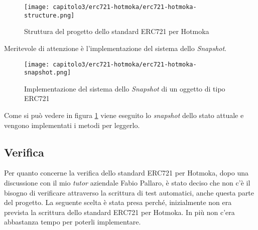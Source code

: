\clearpage

\begin{figure}[h!]
  \centering
  \texttt{[image: capitolo3/erc721-hotmoka/erc721-hotmoka-structure.png]}
  \caption{Struttura del progetto dello standard ERC721 per Hotmoka}
\end{figure}

Meritevole di attenzione è l'implementazione del sistema dello \textit{Snapshot}.

\clearpage

\begin{figure}[h!]
  \centering
  \texttt{[image: capitolo3/erc721-hotmoka/erc721-hotmoka-snapshot.png]}
  \caption{Implementazione del sistema dello \textit{Snapshot} di un oggetto di tipo ERC721}
  \label{fig:erc721-snapshot}
\end{figure}

Come si può vedere in figura \ref{fig:erc721-snapshot} viene eseguito lo \textit{snapshot} dello stato attuale e vengono implementati i metodi per leggerlo.

\subsection{Verifica}
Per quanto concerne la verifica dello standard ERC721 per Hotmoka, dopo una discussione con il mio \textit{tutor} aziendale Fabio Pallaro, è stato deciso che non c'è il bisogno di verificare attraverso la scrittura di test automatici, anche questa parte del progetto. La seguente scelta è stata presa perché, inizialmente non era prevista la scrittura dello standard ERC721 per Hotmoka. In più non c'era abbastanza tempo per poterli implementare.
